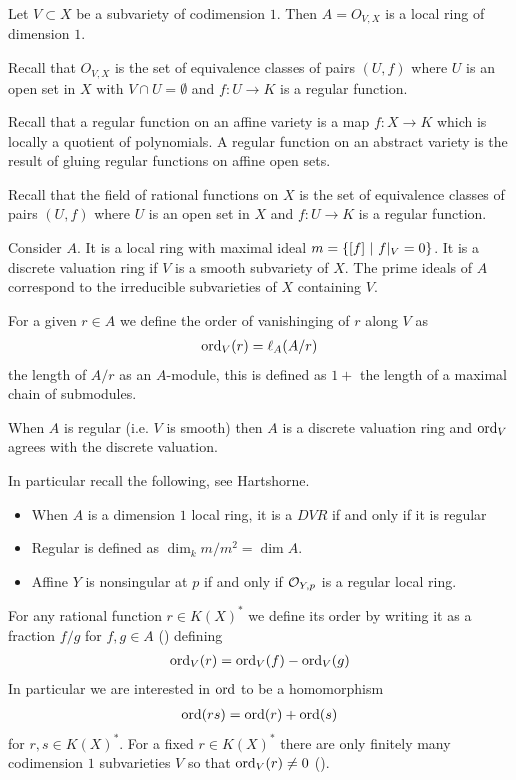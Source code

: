 \documentclass[12pt]{article}
\begin{document}
Let $V\subset X$ be a subvariety of codimension $1$. Then $A = O_{V,X}$ is a local ring of dimension $1$.

\hfill

Recall that $O_{V,X}$ is the set of equivalence classes of pairs $(U,f)$ where $U$ is an open set in $X$ with 
$V\cap U = \emptyset$ and $f:U\to K$ is a regular function. 

\hfill

Recall that a regular function on an affine variety is a map $f:X\to K$ which is locally a quotient of polynomials.
A regular function on an abstract variety is the result of gluing regular functions on affine open sets.

\hfill

Recall that the field of rational functions on $X$ is the set of equivalence classes of pairs $(U,f)$ where $U$ is an open set in $X$
and $f:U\to K$ is a regular function.

\hfill

Consider $A$. It is a local ring with maximal ideal $m = \{[f]\ \vert \  f\vert_V = 0\}$.
It is a discrete valuation ring if $V$ is a smooth subvariety of $X$. The prime ideals of $A$ correspond to 
the irreducible subvarieties of $X$ containing $V$.

\hfill

For a given $r\in A$ we define the order of vanishinging of $r$ along $V$ as \begin{align*}
    \operatorname{ord}_V(r) = \ell_A(A/r)
\end{align*} the length of $A/r$ as an $A$-module, this is defined as $1 + $ 
the length of a maximal chain of submodules.

When $A$ is regular (i.e. $V$ is smooth) then $A$ is a discrete valuation ring and $\operatorname{ord}_V$ agrees
with the discrete valuation. 

\hfill

In particular recall the following, see Hartshorne.
\begin{itemize}
    \item When $A$ is a dimension $1$ local ring, it is a $DVR$ if and only if it is regular 
    \item Regular is defined as $\dim_k m/m^2 = \dim A$.
    \item Affine $Y$ is nonsingular at $p$ if and only if ${\mathcal{O}}_{Y,p}$ is a regular local ring.
\end{itemize}

For any rational function $r\in K(X)^*$ we define its order by 
writing it as a fraction $f/g$ for $f,g\in A$ () defining \begin{align*}
    \operatorname{ord}_V(r) = \operatorname{ord}_V(f) - \operatorname{ord}_V(g)
\end{align*}
In particular we are interested in $\operatorname{ord}$ to be a homomorphism \begin{align*}
    \operatorname{ord}(rs) = \operatorname{ord}(r) + \operatorname{ord}(s)
\end{align*} for $r,s\in K(X)^*$.
For a fixed $r\in K(X)^*$ there are only finitely many codimension $1$ subvarieties $V$ so that 
$\operatorname{ord}_V(r)\neq 0$ ().
\end{document}
